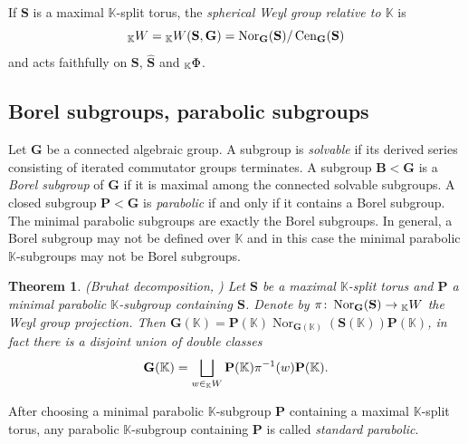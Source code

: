 \documentclass[12pt]{amsart}
\newcommand{\D}{\mathbb{D} }
\newcommand{\K}{\mathbb{K}}
\newcommand{\bG}{\mathbf{G}}
\newcommand{\bS}{\mathbf{S}}
\newcommand{\bB}{\mathbf{B}}
\newcommand{\bP}{\mathbf{P}}
\newcommand{\KPhi}{\vphantom{\Phi}_{\K}\Phi}
\newcommand{\KW}{\vphantom{W}_{\K}W}
\numberwithin{equation}{section}
\newtheorem{theorem}{Theorem}[section]
\theoremstyle{remark} %
\begin{document}
If $\bS$ is a maximal $\K$-split torus, the \emph{spherical Weyl group relative to $\K$} is
$$
\KW =\KW (\bS,\bG) = \operatorname{Nor}_{\bG}(\bS)/\operatorname{Cen}_{\bG}(\bS)
$$
and acts faithfully on $\bS$, $\hat{\bS}$ and $\KPhi$.


\subsection{Borel subgroups, parabolic subgroups}
Let $\bG$ be a connected algebraic group. %
A subgroup is \emph{solvable} if its derived series consisting of iterated commutator groups terminates. A subgroup $\bB < \bG$ is a \emph{Borel subgroup} of $\bG$ if it is maximal among the connected solvable subgroups. %
A closed subgroup $\bP < \bG$ is \emph{parabolic} if and only if it contains a Borel subgroup. %
The minimal parabolic %
subgroups are exactly the Borel subgroups. In general, a Borel subgroup may not be defined over $\K$ and in this case the minimal parabolic $\K$-subgroups may not be Borel subgroups.

\begin{theorem}(Bruhat decomposition, \cite[Theorem 21.15]{Bor})
Let $\bS$ be a maximal $\K$-split torus and $\bP$ a minimal parabolic $\K$-subgroup containing $\bS$.  Denote by $\pi \colon \operatorname{Nor}_{\bG}(\bS) \to \KW$ the Weyl group projection. Then $\bG(\K) = \bP(\K) \operatorname{Nor}_{\bG(\K)}(\bS(\K))\bP(\K)$, in fact there is a disjoint union of double classes
$$
\bG(\K) = \bigsqcup_{w \in  \KW } \bP(\K) \pi^{-1}(w) \bP(\K).
$$
\end{theorem}

After choosing a minimal parabolic $\K$-subgroup $\bP$ containing a maximal $\K$-split torus, any parabolic $\K$-subgroup containing $\bP$ is called \emph{standard parabolic}.
\end{document}
